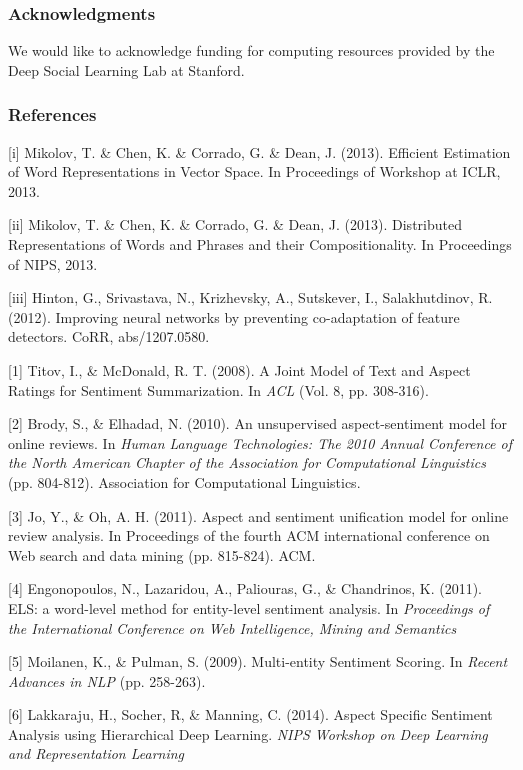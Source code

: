 \documentclass{article} %
\begin{document}
\subsubsection*{Acknowledgments}

We would like to acknowledge funding for computing resources provided by the Deep Social Learning Lab at Stanford.

\subsubsection*{References} %

\small{

[i] Mikolov, T. \& Chen, K. \& Corrado, G. \& Dean, J. (2013). Efficient Estimation of Word Representations in Vector Space. In Proceedings of Workshop at ICLR, 2013.

[ii] Mikolov, T. \& Chen, K. \& Corrado, G. \& Dean, J. (2013). Distributed Representations of Words and Phrases and their Compositionality. In Proceedings of NIPS, 2013.

[iii] Hinton, G., Srivastava, N., Krizhevsky, A., Sutskever, I., Salakhutdinov, R. (2012). Improving neural networks by preventing co-adaptation of feature detectors. CoRR, abs/1207.0580.

[1] Titov, I., \& McDonald, R. T. (2008). A Joint Model of Text and Aspect Ratings for Sentiment Summarization. In {\it ACL} (Vol. 8, pp. 308-316).

[2] Brody, S., \& Elhadad, N. (2010). An unsupervised aspect-sentiment model for online reviews. In {\it Human Language Technologies: The 2010 Annual Conference of the North American Chapter of the Association for Computational Linguistics} (pp. 804-812). Association for Computational Linguistics.

[3] Jo, Y., \& Oh, A. H. (2011). Aspect and sentiment unification model for online review analysis. In Proceedings of the fourth ACM international conference on Web search and data mining (pp. 815-824). ACM.


[4] Engonopoulos, N., Lazaridou, A., Paliouras, G., \& Chandrinos, K. (2011). ELS: a word-level method for entity-level sentiment analysis. In {\it Proceedings of the International Conference on Web Intelligence, Mining and Semantics}


[5] Moilanen, K., \& Pulman, S. (2009). Multi-entity Sentiment Scoring. In {\it Recent Advances in NLP} (pp. 258-263).


[6] Lakkaraju, H., Socher, R, \& Manning, C. (2014). Aspect Specific Sentiment Analysis using Hierarchical Deep Learning. {\it NIPS Workshop on Deep Learning and Representation Learning}

}
\end{document}
